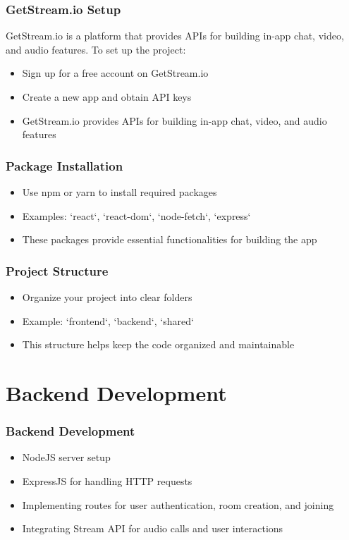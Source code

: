 \documentclass{beamer}
\begin{document}
\begin{frame}
    \frametitle{GetStream.io Setup}
    GetStream.io is a platform that provides APIs for building in-app chat, video, and audio features.
    To set up the project:
    \begin{itemize}
        \item Sign up for a free account on GetStream.io
        \item Create a new app and obtain API keys
        \item GetStream.io provides APIs for building in-app chat, video, and audio features
    \end{itemize}
\end{frame}

\begin{frame}
    \frametitle{Package Installation}
    \begin{itemize}
        \item Use npm or yarn to install required packages
        \item Examples: `react`, `react-dom`, `node-fetch`, `express`
        \item These packages provide essential functionalities for building the app
    \end{itemize}
\end{frame}

\begin{frame}
    \frametitle{Project Structure}
    \begin{itemize}
        \item Organize your project into clear folders
        \item Example: `frontend`, `backend`, `shared`
        \item This structure helps keep the code organized and maintainable
    \end{itemize}
\end{frame}

\section{Backend Development}

\begin{frame}
    \frametitle{Backend Development}
    \begin{itemize}
        \item NodeJS server setup
        \item ExpressJS for handling HTTP requests
        \item Implementing routes for user authentication, room creation, and joining
        \item Integrating Stream API for audio calls and user interactions
    \end{itemize}
\end{frame}
\end{document}
